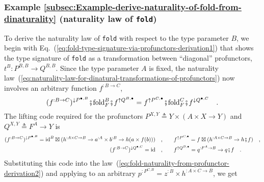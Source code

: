 \subsubsection{Example \label{subsec:Example-derive-naturality-of-fold-from-dinaturality}\ref{subsec:Example-derive-naturality-of-fold-from-dinaturality}
(naturality law of \lstinline!fold!)}

To derive the naturality law of \lstinline!fold! with respect to
the type parameter $B$, we begin with Eq.~(\ref{eq:fold-type-signature-via-profunctors-derivation1})
that shows the type signature of \lstinline!fold! as a transformation
between ``diagonal'' profunctors, $t^{B}:P^{B,B}\rightarrow Q^{B,B}$.
Since the type parameter $A$ is fixed, the naturality law~(\ref{eq:naturality-law-for-dinatural-transformations-of-profunctors})
now involves an arbitrary function $f^{:B\rightarrow C}$,
\begin{equation}
(f^{:B\rightarrow C})^{\downarrow P^{\bullet,B}}\bef\text{fold}_{F}^{B}\bef f^{\uparrow Q^{B,\bullet}}=f^{\uparrow P^{C,\bullet}}\bef\text{fold}_{F}^{C}\bef f^{\downarrow Q^{\bullet,C}}\quad.\label{eq:fold-naturality-from-profunctor-derivation2}
\end{equation}
The lifting code required for the profunctors $P^{X,Y}\triangleq Y\times\left(A\times X\rightarrow Y\right)$
and $Q^{X,Y}\triangleq F^{A}\rightarrow Y$ is
\begin{align*}
(f^{:B\rightarrow C})^{\downarrow P^{\bullet,B}}=\text{id}^{B}\boxtimes(h^{:A\times C\rightarrow B}\rightarrow a^{:A}\times b^{:B}\rightarrow h(a\times f(b)))\quad, & \quad\quad f^{\uparrow P^{C,\bullet}}=f\boxtimes(h^{:A\times C\rightarrow B}\rightarrow h\bef f)\quad,\\
(f^{:B\rightarrow C})^{\downarrow Q^{\bullet,C}}=\text{id}\quad, & \quad\quad f^{\uparrow Q^{B,\bullet}}=q^{:F^{A}\rightarrow B}\rightarrow q\bef f\quad.
\end{align*}
Substituting this code into the law~(\ref{eq:fold-naturality-from-profunctor-derivation2})
and applying to an arbitrary $p^{:P^{C,B}}=z^{:B}\times h^{:A\times C\rightarrow B}$,
we get

